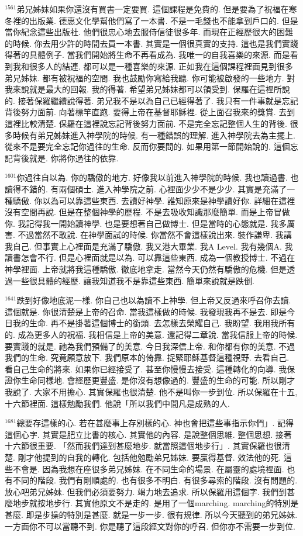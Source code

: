 \documentclass{book}
\begin{document}
$^{1561}$弟兄姊妹如果你還沒有買書一定要買.
這個課程是免費的.
但是要為了祝福在寒冬裡的出版業.
德惠文化學幫他們寫了一本書.
不是一毛錢也不能拿到戶口的.
但是當你紀念這些出版社.
他們很忠心地去服侍信徒很多年.
而現在正經歷很大的困難的時候.
你去用少許的時間去買一本書.
其實是一個很真實的支持.
這也是我們實踐得著的具體例子.
當我們開始將生命不再看成為.
我唯一的自我喜樂的來源.
而是看到我和很多人的結連.
都可以是一種喜樂的來源.
正如我在這個課程裡面見到很多弟兄姊妹.
都有被祝福的空間.
我也鼓勵你寫給我聽.
你可能被啟發的一些地方.
對我來說就是最大的回報.
我的得著.
希望弟兄姊妹都可以領受到.
保羅在這裡所說的.
接著保羅繼續說得著.
弟兄我不是以為自己已經得著了.
我只有一件事就是忘記背後努力面前.
向著標竿直跑.
要得上帝在基督耶穌裡.
從上面召我來的獎賞.
去到這裡比較清楚.
保羅在這裡說忘記背後努力面前.
不是完全忘記整個人生的背後.
很多時候有弟兄姊妹進入神學院的時候.
有一種錯誤的理解.
進入神學院去為主擺上.
從來不是要完全忘記你過往的生命.
反而你要問的.
如果用第一節開始說的.
這個忘記背後就是.
你將你過往的依靠.

$^{1601}$你過往自以為.
你的驕傲的地方.
好像我以前進入神學院的時候.
我也讀過書.
也讀得不錯的.
有兩個碩士.
進入神學院之前.
心裡面少少不是少少.
其實是充滿了一種驕傲.
你以為可以靠這些東西.
去讀好神學.
誰知原來是神學讀好你.
詳細在這裡沒有空間再說.
但是在整個神學的歷程.
不是去吸收知識那麼簡單.
而是上帝冒做你.
我記得我一開始讀神學.
也是要想著自己做博士.
但是當時的心態就是.
我多厲害.
不過當然不敢說.
在神學面試的時候.
你當然不會這樣說出來.
裝作謙卑.
我講我自己.
但事實上心裡面是充滿了驕傲.
我又港大畢業.
我A Level.
我有幾個A.
我讀書怎會不行.
但是心裡面就是以為.
可以靠這些東西.
成為一個教授博士.
不過在神學裡面.
上帝就將我這種驕傲.
徹底地拿走.
當然今天仍然有驕傲的危機.
但是透過一些很具體的經歷.
讓我知道我不是靠這些東西.
簡單來說就是跌倒.

$^{1641}$跌到好像地底泥一樣.
你自己也以為讀不上神學.
但上帝又反過來呼召你去讀.
這個就是.
你很清楚是上帝的召命.
當我這樣做的時候.
我發現我再不是去.
即是今日我的生命.
再不是掛著這個博士的銜頭.
去怎樣去榮耀自己.
我盼望.
我用我所有的.
成為更多人的祝福.
我相信是上帝的美意.
還記得二章說.
當我信服上帝的時候.
要實踐的就是.
祂為我們預備了的美意.
今日我深信上帝.
和你都有你的美意.
不過我們的生命.
究竟願意放下.
我們原本的倚靠.
捉緊耶穌基督這種視野.
去看自己.
看自己生命的將來.
如果你已經接受了.
甚至你慢慢去接受.
這種轉化的向導.
我保證你生命同樣地.
會經歷更豐盛.
是你沒有想像過的.
豐盛的生命的可能.
所以剛才我說了.
大家不用擔心.
其實保羅也很清楚.
他不是叫你一步到位.
所以保羅在十五,十六節裡面.
這樣勉勵我們.
他說「所以我們中間凡是成熟的人.

$^{1681}$總要存這樣的心.
若在甚麼事上存別樣的心.
神也會把這些事指示你們」.
記得這個心字.
其實是肥立比書的核心.
其實他的內容.
是說整個思維.
整個思想.
接著十六節很重要.
「然而我們達到甚麼地步.
就當照這個地步行」.
其實保羅也很清楚.
剛才他提到的自我的轉化.
包括他勉勵弟兄姊妹.
要贏得基督.
效法他的死.
這些不會是.
因為我想在座很多弟兄姊妹.
在不同生命的場景.
在屬靈的處境裡面.
也有不同的階段.
我們有剛順處的.
也有很多不明白.
有很多尋索的階段.
沒有問題的.
放心吧弟兄姊妹.
但我們必須要努力.
竭力地去追求.
所以保羅用這個字.
我們到甚麼地步就按地步行.
其實他原文不是走的.
是用了一個marching.
marching的特別是甚麼.
即是步操的特別是甚麼.
就是一步一步.
很有規律.
所以今天聽到的弟兄姊妹.
一方面你不可以當聽不到.
你是聽了這段經文對你的呼召.
但你亦不需要一步到位.
\end{document}
